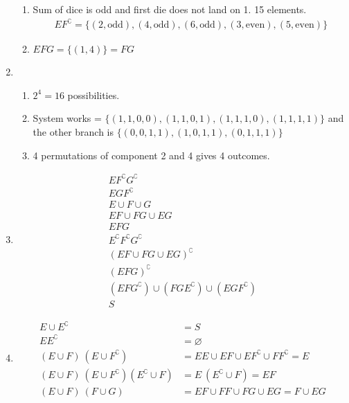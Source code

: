 \begin{enumerate}
\begin{enumerate}
		\item Sum of dice is odd and first die does not land on 1. 15 elements.
		\begin{align}
			E F^\complement = \{ (2, \text{odd}), (4, \text{odd}) , (6, \text{odd}), (3, \text{even}), (5, \text{even})\} 
		\end{align}
		
		\item $ EFG = \{ (1, 4) \} = FG $
	\end{enumerate} 
	
	\item \begin{enumerate}
		\item $ 2^4 = 16 $ possibilities.
		
		\item System works = $ \{ (1,1,0,0), (1,1,0,1), (1,1,1,0), (1,1,1,1)\} $ and the other branch is
		$ \{ (0,0,1,1), (1,0,1,1), (0,1,1,1) \} $ \\
		
		\item 4 permutations of component 2 and 4 gives 4 outcomes.
	\end{enumerate}
	
	\item \begin{subequations}
		\begin{align}
			E F^\complement G^\complement \\
			E G F^\complement \\
			E \cup F \cup G \\
			EF \cup FG \cup EG \\
			EFG \\
			E ^\complement F^\complement G^\complement \\
			(EF \cup FG \cup EG )^\complement \\
			( EFG )^\complement \\
			( EF G^\complement) \cup (FG E^\complement) \cup (EG F^\complement) \\
			S
		\end{align}
	\end{subequations}
	
	\item \begin{subequations}
		\begin{align}
			E \cup E^\complement &= S \\
			E E^\complement &= \varnothing \\
			(E \cup F)\ (E \cup F^\complement) &= EE \cup EF \cup EF^\complement \cup FF^\complement = E \\
			(E \cup F)\ (E \cup F^\complement) (E^\complement \cup F) &= E\ (E^\complement \cup F) = EF \\
			(E \cup F)\ (F \cup G) &= EF \cup FF \cup FG \cup EG = F \cup EG
		\end{align}
	\end{subequations}
	

\end{enumerate}
